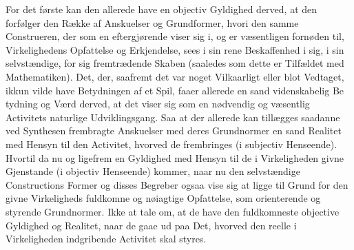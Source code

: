 \documentclass[12pt]{book}
\def\textit#1{#1}%
\def\\{ }%
\newcommand{\rubrik}[2]{%
  \par\vspace{1.1\baselineskip}%
  \begin{center}
    {\large\textit{#1}\par}\vspace{0.35\baselineskip}
    {#2\par}
  \end{center}
  \vspace{0.5\baselineskip}
  \phantomsection
  \addcontentsline{toc}{section}{\texorpdfstring{#1\ #2}{#1 #2}}%
}
\newcommand{\opage}[1]{\marginnote{\footnotesize\textit{[#1]}}}
\begin{document}
For det første kan den allerede have en objectiv Gyldighed derved, at den
forfølger den Række af Anskuelser og Grundformer, hvori den samme Construeren,
der som en eftergjørende viser sig i, og er væsentligen fornøden til,
Virkelighedens Opfattelse og Erkjendelse, sees i sin rene Beskaffenhed i sig, i
sin selvstændige, for sig fremtrædende Skaben (saaledes som dette er Tilfældet
med Mathematiken). Det, der, saafremt det var noget Vilkaarligt eller blot
Vedtaget, ikkun vilde have Betydningen af et Spil, faaer allerede en sand
videnskabelig Be%
\opage{179}%
tydning og Værd derved, at det viser sig som en nødvendig og væsentlig Activitets
naturlige Udviklingsgang. Saa at der allerede kan tillægges saadanne ved Synthesen
frembragte Anskuelser med deres Grundnormer en sand Realitet med Hensyn til den
Activitet, hvorved de frembringes (i subjectiv Henseende). Hvortil da nu og ligefrem
en Gyldighed med Hensyn til de i Virkeligheden givne Gjenstande (i objectiv
Henseende) kommer, naar nu den selvstændige Constructions Former og disses Begreber
ogsaa vise sig at ligge til Grund for den givne Virkeligheds fuldkomne og nøiagtige
Opfattelse, som orienterende og styrende Grundnormer. Ikke at tale om, at de have
den fuldkomneste objective Gyldighed og Realitet, naar de gaae ud paa Det, hvorved
den reelle i Virkeligheden indgribende Activitet skal styres.
\end{document}
